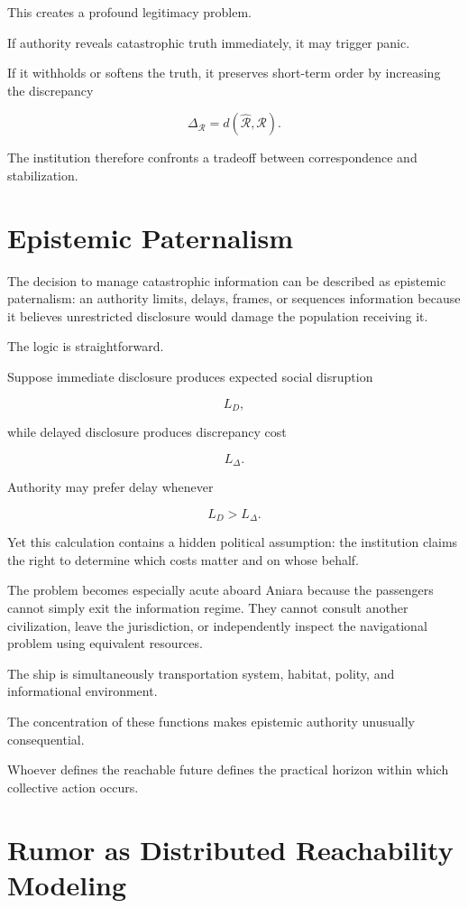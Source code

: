 \documentclass[11pt,oneside]{book}
\theoremstyle{definition}
\theoremstyle{remark}
\newcommand{\R}{\mathcal{R}}
\begin{document}
This creates a profound legitimacy problem.

If authority reveals catastrophic truth immediately, it may trigger panic.

If it withholds or softens the truth, it preserves short-term order by increasing the discrepancy

\[
\Delta_{\R}
=
d(\widehat{\R},\R).
\]

The institution therefore confronts a tradeoff between correspondence and stabilization.

\section{Epistemic Paternalism}

The decision to manage catastrophic information can be described as epistemic paternalism: an authority limits, delays, frames, or sequences information because it believes unrestricted disclosure would damage the population receiving it.

The logic is straightforward.

Suppose immediate disclosure produces expected social disruption

\[
L_D,
\]

while delayed disclosure produces discrepancy cost

\[
L_\Delta.
\]

Authority may prefer delay whenever

\[
L_D>L_\Delta.
\]

Yet this calculation contains a hidden political assumption: the institution claims the right to determine which costs matter and on whose behalf.

The problem becomes especially acute aboard Aniara because the passengers cannot simply exit the information regime. They cannot consult another civilization, leave the jurisdiction, or independently inspect the navigational problem using equivalent resources.

The ship is simultaneously transportation system, habitat, polity, and informational environment.

The concentration of these functions makes epistemic authority unusually consequential.

Whoever defines the reachable future defines the practical horizon within which collective action occurs.

\section{Rumor as Distributed Reachability Modeling}
\end{document}
